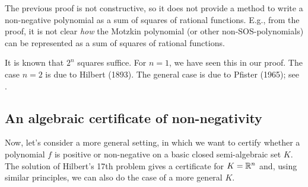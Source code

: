 \begin{remark}
The previous proof is not constructive, so it does not provide a method to write a non-negative polynomial as a sum of squares of rational functions. E.g., from the proof, it is not clear \emph{how} the Motzkin polynomial (or other non-SOS-polynomials) can be represented as a sum of squares of rational functions. 


\end{remark}

\begin{remark}
	It is known that $2^n$ squares suffice. For $n=1$, we have seen this in our proof. The case $n=2$ is due to Hilbert (1893). The general case is due to Pfister (1965); see \cite{Bochnak:Coste:Roy:1998}. 
\end{remark}

\subsection{An algebraic certificate of non-negativity}

Now, let's consider a more general setting, in which we want to certify whether a polynomial $f$ is positive or non-negative on a basic closed semi-algebraic set $K$. The solution of Hilbert's 17th problem gives a certificate for $K=\mathbb{R}^n$ and, using similar principles, we can also do the case of a more general $K$. 


